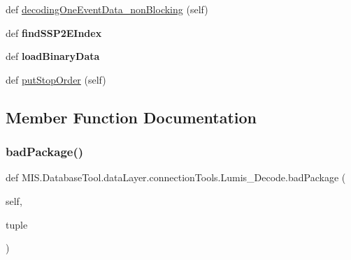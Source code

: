 \begin{DoxyCompactItemize}
\item 
def \hyperlink{classMIS_1_1DatabaseTool_1_1dataLayer_1_1connectionTools_1_1Lumis__Decode_a8a26cb0681a32eca90be17d71bc2cf64}{decoding\+One\+Event\+Data\+\_\+non\+Blocking} (self)
\item 
\mbox{\label{classMIS_1_1DatabaseTool_1_1dataLayer_1_1connectionTools_1_1Lumis__Decode_a2634128ee42cef032a40f7d92fa31227}} 
def {\bfseries find\+S\+S\+P2\+E\+Index}
\item 
\mbox{\label{classMIS_1_1DatabaseTool_1_1dataLayer_1_1connectionTools_1_1Lumis__Decode_a5565e250a819f357977619f6bae0714b}} 
def {\bfseries load\+Binary\+Data}
\item 
def \hyperlink{classMIS_1_1DatabaseTool_1_1dataLayer_1_1connectionTools_1_1Lumis__Decode_abec17520982f010a6364f849b4a84c00}{put\+Stop\+Order} (self)
\end{DoxyCompactItemize}


\subsection{Member Function Documentation}
\mbox{\label{classMIS_1_1DatabaseTool_1_1dataLayer_1_1connectionTools_1_1Lumis__Decode_a02ba970c665bc6aee5faedf9cc379bf4}} 
\subsubsection{\texorpdfstring{bad\+Package()}{badPackage()}}
{\footnotesize\ttfamily def M\+I\+S.\+Database\+Tool.\+data\+Layer.\+connection\+Tools.\+Lumis\+\_\+\+Decode.\+bad\+Package (\begin{DoxyParamCaption}\item[{}]{self,  }\item[{}]{tuple }\end{DoxyParamCaption})}

